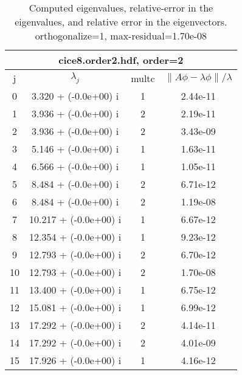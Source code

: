 \begin{table}[H]\tableFont %
\begin{center}
\begin{tabular}{|c|c|c|c|}  \hline
\multicolumn{4}{|c|}{cice8.order2.hdf, order=2} \\ \hline
   j    &         $\lambda_j$      & multc & $\| A\phi - \lambda\phi\|/\lambda$     \\ \hline
     0  &      3.320 + (-0.0e+00) i   &   1     &    2.44e-11   \\
     1  &      3.936 + (-0.0e+00) i   &   2     &    2.19e-11   \\
     2  &      3.936 + (-0.0e+00) i   &   2     &    3.43e-09   \\
     3  &      5.146 + (-0.0e+00) i   &   1     &    1.63e-11   \\
     4  &      6.566 + (-0.0e+00) i   &   1     &    1.05e-11   \\
     5  &      8.484 + (-0.0e+00) i   &   2     &    6.71e-12   \\
     6  &      8.484 + (-0.0e+00) i   &   2     &    1.19e-08   \\
     7  &     10.217 + (-0.0e+00) i   &   1     &    6.67e-12   \\
     8  &     12.354 + (-0.0e+00) i   &   1     &    9.23e-12   \\
     9  &     12.793 + (-0.0e+00) i   &   2     &    6.70e-12   \\
    10  &     12.793 + (-0.0e+00) i   &   2     &    1.70e-08   \\
    11  &     13.400 + (-0.0e+00) i   &   1     &    6.75e-12   \\
    12  &     15.081 + (-0.0e+00) i   &   1     &    6.99e-12   \\
    13  &     17.292 + (-0.0e+00) i   &   2     &    4.14e-11   \\
    14  &     17.292 + (-0.0e+00) i   &   2     &    4.01e-09   \\
    15  &     17.926 + (-0.0e+00) i   &   1     &    4.16e-12   \\
\hline
\end{tabular}
\caption{Computed eigenvalues, relative-error in the eigenvalues, and relative error in the eigenvectors. orthogonalize=1, max-residual=1.70e-08
}\label{table:genEigscice8.order2.hdf}
\end{center}
\end{table}
